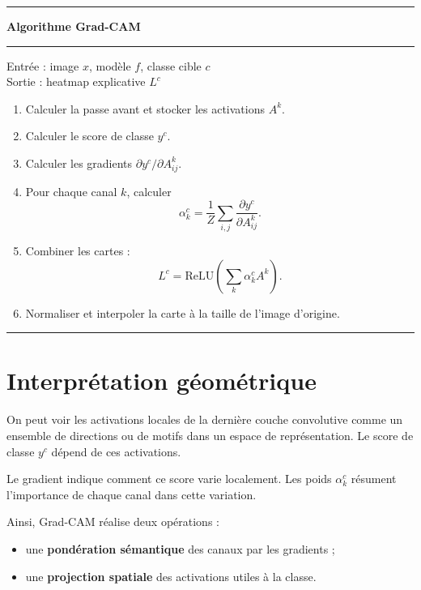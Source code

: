 ﻿\documentclass[11pt,a4paper]{article}
\begin{document}
\begin{center}
\begin{minipage}{0.92\linewidth}
\hrule
\vspace{0.4em}
\textbf{Algorithme Grad-CAM}
\vspace{0.4em}
\hrule
\vspace{0.6em}
Entrée : image $x$, modèle $f$, classe cible $c$ \\
Sortie : heatmap explicative $L^c$

\begin{enumerate}[label=\arabic*)]
    \item Calculer la passe avant et stocker les activations $A^k$.
    \item Calculer le score de classe $y^c$.
    \item Calculer les gradients $\partial y^c / \partial A_{ij}^k$.
    \item Pour chaque canal $k$, calculer
    \[
    \alpha_k^c = \frac{1}{Z}\sum_{i,j} \frac{\partial y^c}{\partial A_{ij}^k}.
    \]
    \item Combiner les cartes :
    \[
    L^c = \mathrm{ReLU}\left(\sum_k \alpha_k^c A^k\right).
    \]
    \item Normaliser et interpoler la carte à la taille de l'image d'origine.
\end{enumerate}
\vspace{0.6em}
\hrule
\end{minipage}
\end{center}

\section{Interprétation géométrique}

On peut voir les activations locales de la dernière couche convolutive comme un ensemble de directions ou de motifs dans un espace de représentation. Le score de classe $y^c$ dépend de ces activations.

Le gradient indique comment ce score varie localement. Les poids $\alpha_k^c$ résument l'importance de chaque canal dans cette variation.

Ainsi, Grad-CAM réalise deux opérations :
\begin{itemize}
    \item une \textbf{pondération sémantique} des canaux par les gradients ;
    \item une \textbf{projection spatiale} des activations utiles à la classe.
\end{itemize}
\end{document}
